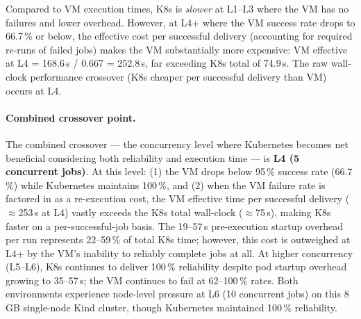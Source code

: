 Compared to VM execution times, K8s is \emph{slower} at L1--L3 where the VM has no failures and lower overhead.
However, at L4+ where the VM success rate drops to 66.7\,\% or below, the effective cost per successful delivery (accounting for required re-runs of failed jobs) makes the VM substantially more expensive: VM effective at L4 = 168.6\,s / 0.667 = 252.8\,s, far exceeding K8s total of 74.9\,s.
The raw wall-clock performance crossover (K8s cheaper per successful delivery than VM) occurs at L4.

\paragraph{Combined crossover point.}
The combined crossover --- the concurrency level where Kubernetes becomes net beneficial considering both reliability and execution time --- is \textbf{L4 (5 concurrent jobs)}.
At this level: (1) the VM drops below 95\,\% success rate (66.7\,\%) while Kubernetes maintains 100\,\%, and (2) when the VM failure rate is factored in as a re-execution cost, the VM effective time per successful delivery ($\approx$253\,s at L4) vastly exceeds the K8s total wall-clock ($\approx$75\,s), making K8s faster on a per-successful-job basis.
The 19--57\,s pre-execution startup overhead per run represents 22--59\,\% of total K8s time; however, this cost is outweighed at L4+ by the VM's inability to reliably complete jobs at all.
At higher concurrency (L5--L6), K8s continues to deliver 100\,\% reliability despite pod startup overhead growing to 35--57\,s; the VM continues to fail at 62--100\,\% rates.
Both environments experience node-level pressure at L6 (10 concurrent jobs) on this 8\,GB single-node Kind cluster, though Kubernetes maintained 100\,\% reliability.

